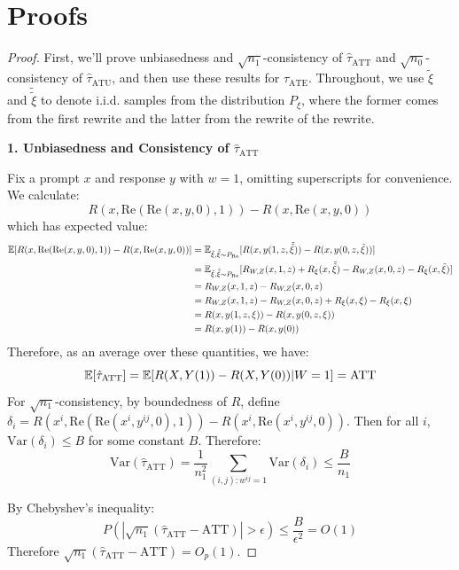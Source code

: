 \documentclass{article}
\begin{document}
\section{Proofs}
\label{sec:proofs}
\mainthm*
\begin{proof}
  First, we'll prove unbiasedness and $\sqrt{n_1}$-consistency of $\hat{\tau}_{\text{ATT}}$ and $\sqrt{n_0}$-consistency of $\hat{\tau}_{\text{ATU}}$, and then use these results for $\hat{\tau}_{\text{ATE}}$. Throughout, we use $\tilde{\xi}$ and $\tilde{\tilde{\xi}}$ to denote i.i.d. samples from the distribution $P_\xi$, where the former comes from the first rewrite and the latter from the rewrite of the rewrite.
  
  \textbf{1. Unbiasedness and Consistency of $\hat{\tau}_{\text{ATT}}$}
  
  Fix a prompt $x$ and response $y$ with $w = 1$, omitting superscripts for convenience. We calculate:
  \[R(x, \text{Re}(\text{Re}(x, y, 0), 1)) - R(x, \text{Re}(x, y, 0))\]
  which has expected value:
  \begin{align*}
  \mathbb{E}[R(x, \text{Re}(\text{Re}(x, y, 0), 1)) - R(x, \text{Re}(x, y, 0))] &= \mathbb{E}_{\tilde{\xi}, \tilde{\tilde{\xi}} \sim P_{\text{Re}}}[R(x, y(1, z, \tilde{\tilde{\xi}})) - R(x, y(0, z, \tilde{\xi}))] \\
  &= \mathbb{E}_{\tilde{\xi}, \tilde{\tilde{\xi}} \sim P_{\text{Re}}}[R_{W,Z}(x, 1, z) + R_\xi(x, \tilde{\tilde{\xi}}) - R_{W,Z}(x, 0, z) - R_\xi(x, \tilde{\xi})] \\
  &= R_{W,Z}(x, 1, z) - R_{W,Z}(x, 0, z) \\
  &= R_{W,Z}(x, 1, z) - R_{W,Z}(x, 0, z) + R_\xi(x, \xi) - R_\xi(x, \xi) \\
  &= R(x, y(1, z, \xi)) - R(x, y(0, z, \xi)) \\
  &= R(x, y(1)) - R(x, y(0))
  \end{align*}
  Therefore, as an average over these quantities, we have:
  \[\mathbb{E}[\hat{\tau}_{\text{ATT}}] = \mathbb{E}[R(X, Y(1)) - R(X, Y(0)) | W = 1] = \text{ATT}\]
  For $\sqrt{n_1}$-consistency, by boundedness of $R$, define $\delta_i = R(x^i, \text{Re}(\text{Re}(x^i, y^{ij}, 0), 1)) - R(x^i, \text{Re}(x^i, y^{ij}, 0))$. Then for all $i$, $\text{Var}(\delta_i) \leq B$ for some constant $B$. Therefore:
  \[\text{Var}(\hat{\tau}_{\text{ATT}}) = \frac{1}{n_1^2} \sum_{(i, j): w^{ij} = 1} \text{Var}(\delta_i) \leq \frac{B}{n_1}\]
  
  By Chebyshev's inequality:
  \[P(|\sqrt{n_1}(\hat{\tau}_{\text{ATT}} - \text{ATT})| > \epsilon) \leq \frac{B}{\epsilon^2} = O(1)\]
  Therefore $\sqrt{n_1}(\hat{\tau}_{\text{ATT}} - \text{ATT}) = O_p(1)$.
  

\end{proof}
\end{document}
